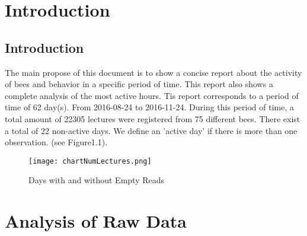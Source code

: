 \documentclass[11pt,fleqn]{book} %
\begin{document}

\pagestyle{empty} %

\tableofcontents %


\pagestyle{fancy} %


\chapter{Introduction}

\normalsize%
\section*{Introduction}%
The main propose of this document  is to show a concise report about the activity of bees and behavior in a specific period of time. This report also shows a complete analysis of the most active hours.\newline%
\newline%
Tis report corresponds to a period of time of 62 day(s). From 2016{-}08{-}24 to 2016{-}11{-}24. During this period of time, a total amount of 22305 lectures were registered from 75 different bees. There exist a total of 22 non{-}active days. We define an 'active day' if there is more than one observation. (see Figure1.1).\newline%
\newline%
%


\begin{figure}[h!]%
\centering%
\texttt{[image: chartNumLectures.png]}%
\caption{Days with and without Empty Reads}%
\end{figure}


\chapter{Analysis of Raw Data}
\normalsize%
\end{document}
